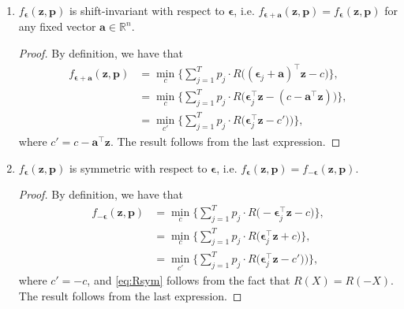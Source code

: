\documentclass[10pt, twocolumn]{article}
\theoremstyle{plain}
\theoremstyle{definition}
\begin{document}
\begin{appendices}
\begin{enumerate}[itemsep=-0.15em, topsep=0pt, leftmargin=*]
  \item \(f_{\bm{\epsilon}}(\bm{z}, \bm{p})\) is shift-invariant with respect 
  to \(\bm{\epsilon}\), i.e. \(f_{\bm{\epsilon}+\bm{a}}(\bm{z}, \bm{p}) = 
  f_{\bm{\epsilon}}(\bm{z}, \bm{p}) \) for any fixed vector \(\bm{a} \in 
  \mathbb{R}^n\).
  \begin{proof} 
  By definition, we have that
  \begin{align*}
  	f_{\bm{\epsilon}+\bm{a}}(\bm{z}, \bm{p}) 
	&= \min_c \bigg\{\sum_{j=1}^T p_j\cdot R\big((\bm{\epsilon}_j 
		+ \bm{a})^\top \bm{z} - c\big)\bigg\},\\
	&= \min_c \bigg\{\sum_{j=1}^T p_j\cdot R\big(\bm{\epsilon}_j^\top
		\bm{z} - (c - \bm{a}^\top\bm{z})\big)\bigg\},\\
	&= \min_{c'} \bigg\{\sum_{j=1}^T p_j\cdot R\big(\bm{\epsilon}_j^\top
		\bm{z} - c')\big)\bigg\},
  \end{align*}
  where \(c' = c - \bm{a}^\top \bm{z}\). The result follows from the last 
  expression.
  \end{proof}
		
  \item \(f_{\bm{\epsilon}}(\bm{z}, \bm{p})\) is symmetric with respect 
  to \(\bm{\epsilon}\), i.e. \(f_{\bm{\epsilon}}(\bm{z}, \bm{p}) = 
  f_{-\bm{\epsilon}}(\bm{z}, \bm{p}) \).
  \begin{proof}
  By definition, we have that
  \begin{align}
	f_{-\bm{\epsilon}}(\bm{z}, \bm{p}) 
	&= \min_c \bigg\{\sum_{j=1}^T p_j\cdot R\big(-\bm{\epsilon}_j^\top \bm{z} 
	- c\big)\bigg\},\nonumber \\
	&= \min_c \bigg\{\sum_{j=1}^T p_j\cdot R\big(\bm{\epsilon}_j^\top \bm{z} 
	+ c \big)\bigg\}, \label{eq:Rsym}\\
	&= \min_{c'} \bigg\{\sum_{j=1}^T p_j\cdot R\big(\bm{\epsilon}_j^\top \bm{z} 
	- c')\big)\bigg\}, \nonumber
  \end{align}
  where \(c' = - c \), and \eqref{eq:Rsym}  follows from the fact that 
  \(R(X) = R(-X)\). The result follows from the last expression.
  \end{proof}
          		
\end{enumerate}


\end{appendices}
\end{document}
